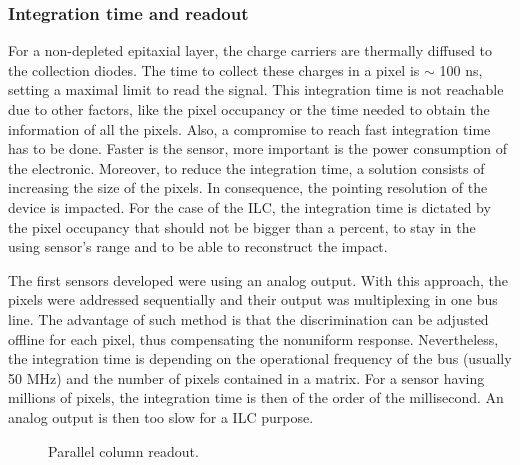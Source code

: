     \subsubsection{Integration time and readout}

    For a non-depleted epitaxial layer, the charge carriers are thermally diffused to the collection diodes.
    The time to collect these charges in a pixel is $\sim$ 100 ns, setting a maximal limit to read the signal.
    This integration time is not reachable due to other factors, like the pixel occupancy or the time needed to obtain the information of all the pixels.
    Also, a compromise to reach fast integration time has to be done.
    Faster is the sensor, more important is the power consumption of the electronic.
    Moreover, to reduce the integration time, a solution consists of increasing the size of the pixels.
    In consequence, the pointing resolution of the device is impacted.
    For the case of the \gls{ILC}, the integration time is dictated by the pixel occupancy that should not be bigger than a percent, to stay in the using sensor's range and to be able to reconstruct the impact.

    The first sensors developed were using an analog output.
    With this approach, the pixels were addressed sequentially and their output was multiplexing in one bus line.
    The advantage of such method is that the discrimination can be adjusted offline for each pixel, thus compensating the nonuniform response.
    Nevertheless, the integration time is depending on the operational frequency of the bus (usually 50 MHz) and the number of pixels contained in a matrix.
    For a sensor having millions of pixels, the integration time is then of the order of the millisecond.
    An analog output is then too slow for a \gls{ILC} purpose. 
    
    \begin{figure}[!h]
      \centering
      \caption{Parallel column readout.}
      \label{fig:rollShut}
    \end{figure}
    
